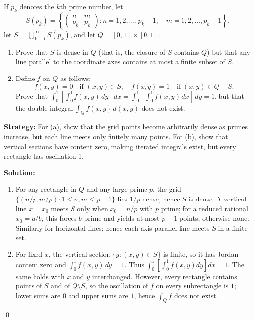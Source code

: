 \begin{problembox}
If \( p_k \) denotes the \( k \)th prime number, let
\[S(p_k) = \left\{ \begin{pmatrix}
n & m \\
p_k & p_k
\end{pmatrix} : n = 1, 2, \ldots, p_k - 1, \quad m = 1, 2, \ldots, p_k - 1 \right\},\]
let \( S = \bigcup_{k=1}^{\infty} S(p_k) \), and let \( Q = [0, 1] \times [0, 1] \).

\begin{enumerate}[label=(\alph*)]
    \item Prove that \( S \) is dense in \( Q \) (that is, the closure of \( S \) contains \( Q \)) but that any line parallel to the coordinate axes contains at most a finite subset of \( S \).
    
    \item Define \( f \) on \( Q \) as follows:
    \[f(x, y) = 0 \quad \text{if } (x, y) \in S, \quad f(x, y) = 1 \quad \text{if } (x, y) \in Q - S.\]
    Prove that \( \int_{0}^{1} \left[ \int_{0}^{1} f(x, y) \, dy \right] \, dx = \int_{0}^{1} \left[ \int_{0}^{1} f(x, y) \, dx \right] \, dy = 1 \), but that the double integral \( \int_{Q} f(x, y) \, d(x, y) \) does not exist.
\end{enumerate}
\end{problembox}

\noindent\textbf{Strategy:} For (a), show that the grid points become arbitrarily dense as primes increase, but each line meets only finitely many points. For (b), show that vertical sections have content zero, making iterated integrals exist, but every rectangle has oscillation 1.

\bigskip\noindent\textbf{Solution:}
\begin{enumerate}[label=(\alph*)]
    \item For any rectangle in $Q$ and any large prime $p$, the grid $\{(n/p,m/p):1\le n,m\le p-1\}$ lies $1/p$-dense, hence $S$ is dense. A vertical line $x=x_0$ meets $S$ only when $x_0=n/p$ with $p$ prime; for a reduced rational $x_0=a/b$, this forces $b$ prime and yields at most $p-1$ points, otherwise none. Similarly for horizontal lines; hence each axis-parallel line meets $S$ in a finite set.
    \item For fixed $x$, the vertical section $\{y:(x,y)\in S\}$ is finite, so it has Jordan content zero and $\int_0^1 f(x,y)\,dy=1$. Thus $\int_0^1\![\int_0^1 f(x,y)dy]dx=1$. The same holds with $x$ and $y$ interchanged. However, every rectangle contains points of $S$ and of $Q\setminus S$, so the oscillation of $f$ on every subrectangle is $1$; lower sums are $0$ and upper sums are $1$, hence $\int_Q f$ does not exist.
\end{enumerate}\qed
